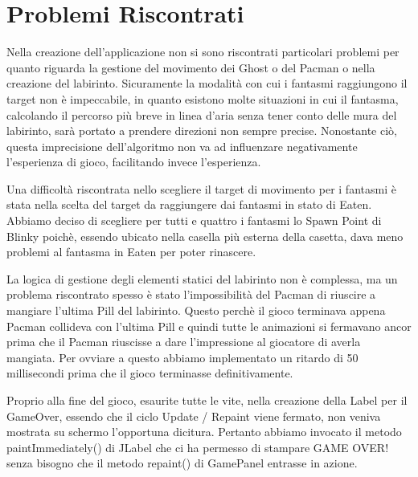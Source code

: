 \documentclass[12pt,a4paper]{report}
\begin{document}
\section{Problemi Riscontrati}\label{ch:proris}
Nella creazione dell’applicazione non si sono riscontrati particolari problemi per quanto riguarda la gestione del movimento dei Ghost o del Pacman o nella creazione del labirinto. 
Sicuramente la modalità con cui i fantasmi raggiungono il target non è impeccabile, in quanto esistono molte situazioni in cui il fantasma, calcolando il percorso più breve in linea d’aria senza tener conto delle mura del labirinto, sarà portato a prendere direzioni non sempre precise. Nonostante ciò, questa imprecisione dell’algoritmo non va ad influenzare negativamente l’esperienza di gioco, facilitando invece l’esperienza.

Una difficoltà riscontrata nello scegliere il target di movimento per i fantasmi è stata nella scelta del target da raggiungere dai fantasmi in stato di Eaten. Abbiamo deciso di scegliere per tutti e quattro i fantasmi lo Spawn Point di Blinky poichè, essendo ubicato nella casella più esterna della casetta, dava meno problemi al fantasma in Eaten per poter rinascere.

La logica di gestione degli elementi statici del labirinto non è complessa, ma un problema riscontrato spesso è stato l’impossibilità del Pacman di riuscire a mangiare l’ultima Pill del labirinto. Questo perchè il gioco terminava appena Pacman collideva con l’ultima Pill e quindi tutte le animazioni si fermavano ancor prima che il Pacman riuscisse a dare l’impressione al giocatore di averla mangiata. Per ovviare a questo abbiamo implementato un ritardo di 50 millisecondi prima che il gioco terminasse definitivamente.

Proprio alla fine del gioco, esaurite tutte le vite, nella creazione della Label per il GameOver, essendo che il ciclo Update / Repaint viene fermato, non veniva mostrata su schermo l’opportuna dicitura. Pertanto abbiamo invocato il metodo paintImmediately() di JLabel che ci ha permesso di stampare GAME OVER! senza bisogno che il metodo repaint() di GamePanel entrasse in azione.
\end{document}
